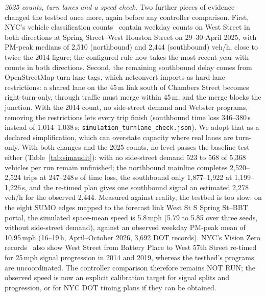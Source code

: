 \textit{2025 counts, turn lanes and a speed check.} Two further pieces of evidence changed the testbed once more,
again before any controller comparison. First, NYC's vehicle classification counts~\cite{nycclasscounts} contain weekday counts on West
Street in both directions at Spring Street--West Houston Street on 29--30 April 2025, with PM-peak medians of 2{,}510
(northbound) and 2{,}444 (southbound) veh/h, close to twice the 2014 figure; the configured rule now takes the most
recent year with counts in both directions. Second, the remaining southbound delay comes from OpenStreetMap turn-lane
tags, which netconvert imports as hard lane restrictions: a shared lane on the 45\,m link south of Chambers Street
becomes right-turn-only, through traffic must merge within 45\,m, and the merge blocks the junction. With the 2014
count, no side-street demand and Webster programs, removing the restrictions lets every trip finish (southbound time
loss 346--380\,s instead of 1{,}014--1{,}038\,s; \texttt{simulation\_turnlane\_check.json}). We adopt that as a
declared simplification, which can overstate capacity where real lanes are turn-only. With both changes and the 2025
counts, no level passes the baseline test either (Table~\ref{tab:simaudit}): with no side-street demand 523 to 568 of
5{,}368 vehicles per run remain unfinished; the northbound mainline completes 2{,}520--2{,}524 trips at 247--248\,s
of time loss, the southbound only 1{,}877--1{,}922 at 1{,}199--1{,}226\,s, and the re-timed plan gives one southbound
signal an estimated 2{,}278\,veh/h for the observed 2{,}444. Measured against reality, the testbed is too slow: on the
eight SUMO edges mapped to the forecast link West St S Spring St--BBT portal, the simulated space-mean speed is 5.8\,mph
(5.79 to 5.85 over three seeds, without side-street demand), against an observed weekday PM-peak mean of 10.95\,mph
(16--19\,h, April--October 2026, 3{,}692 DOT records). NYC's Vision Zero records~\cite{nycvzvretiming} also show West Street from Battery
Place to West 57th Street re-timed for 25\,mph signal progression in 2014 and 2019, whereas the testbed's programs are
uncoordinated. The controller comparison therefore remains NOT RUN; the observed speed is now an explicit calibration
target for signal splits and progression, or for NYC DOT timing plans if they can be obtained.

